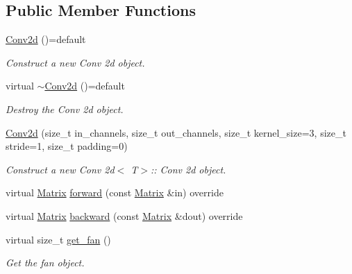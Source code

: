 \subsection*{Public Member Functions}
\begin{DoxyCompactItemize}
\item 
\mbox{\hyperlink{class_conv2d_ae28c4831d44bdf769768f29b9892e5d2}{Conv2d}} ()=default
\begin{DoxyCompactList}\small\item\em Construct a new Conv 2d object. \end{DoxyCompactList}\item 
virtual \mbox{\hyperlink{class_conv2d_a78911057f811daadff49ec744f063e3c}{$\sim$\+Conv2d}} ()=default
\begin{DoxyCompactList}\small\item\em Destroy the Conv 2d object. \end{DoxyCompactList}\item 
\mbox{\hyperlink{class_conv2d_a5676e8e1db6826703489568ff32c1436}{Conv2d}} (size\+\_\+t in\+\_\+channels, size\+\_\+t out\+\_\+channels, size\+\_\+t kernel\+\_\+size=3, size\+\_\+t stride=1, size\+\_\+t padding=0)
\begin{DoxyCompactList}\small\item\em Construct a new Conv 2d$<$ T$>$\+:: Conv 2d object. \end{DoxyCompactList}\item 
virtual \mbox{\hyperlink{class_conv2d_a8263e2f2c46243e39fbca5712603c0fd}{Matrix}} \mbox{\hyperlink{class_conv2d_ab795f6a1cabcfedfb2fcb55c9389c2fe}{forward}} (const \mbox{\hyperlink{class_conv2d_a8263e2f2c46243e39fbca5712603c0fd}{Matrix}} \&in) override
\item 
virtual \mbox{\hyperlink{class_conv2d_a8263e2f2c46243e39fbca5712603c0fd}{Matrix}} \mbox{\hyperlink{class_conv2d_ab5a54c023efbc6206b8f4aa355e5faa9}{backward}} (const \mbox{\hyperlink{class_conv2d_a8263e2f2c46243e39fbca5712603c0fd}{Matrix}} \&dout) override
\item 
virtual size\+\_\+t \mbox{\hyperlink{class_conv2d_a6eeedff6c4d0864a4c3788e06e82a2e4}{get\+\_\+fan}} ()
\begin{DoxyCompactList}\small\item\em Get the fan object. \end{DoxyCompactList}\end{DoxyCompactItemize}
